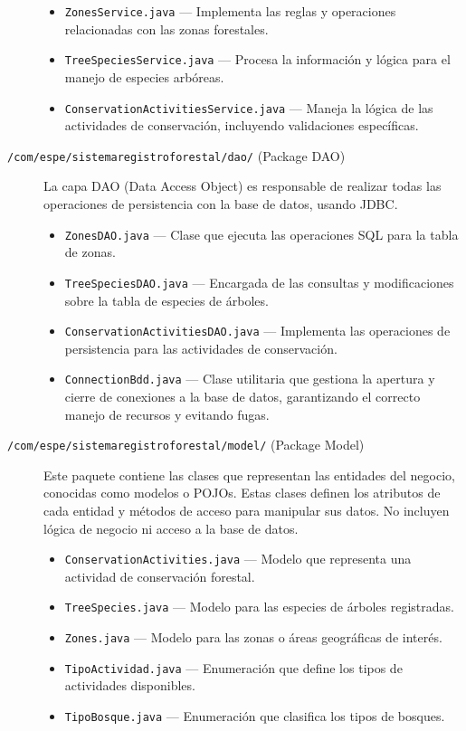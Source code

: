 \begin{description}
    \begin{itemize}
        \item \texttt{ZonesService.java} — Implementa las reglas y operaciones relacionadas con las zonas forestales.
        \item \texttt{TreeSpeciesService.java} — Procesa la información y lógica para el manejo de especies arbóreas.
        \item \texttt{ConservationActivitiesService.java} — Maneja la lógica de las actividades de conservación, incluyendo validaciones específicas.
    \end{itemize}
    \item[\texttt{/com/espe/sistemaregistroforestal/dao/} (Package DAO)] La capa DAO (Data Access Object) es responsable de realizar todas las operaciones de persistencia con la base de datos, usando JDBC.
    \begin{itemize}
        \item \texttt{ZonesDAO.java} — Clase que ejecuta las operaciones SQL para la tabla de zonas.
        \item \texttt{TreeSpeciesDAO.java} — Encargada de las consultas y modificaciones sobre la tabla de especies de árboles.
        \item \texttt{ConservationActivitiesDAO.java} — Implementa las operaciones de persistencia para las actividades de conservación.
        \item \texttt{ConnectionBdd.java} — Clase utilitaria que gestiona la apertura y cierre de conexiones a la base de datos, garantizando el correcto manejo de recursos y evitando fugas.
    \end{itemize}
    \item[\texttt{/com/espe/sistemaregistroforestal/model/} (Package Model)] Este paquete contiene las clases que representan las entidades del negocio, conocidas como modelos o POJOs. Estas clases definen los atributos de cada entidad y métodos de acceso para manipular sus datos. No incluyen lógica de negocio ni acceso a la base de datos.
    \begin{itemize}
        \item \texttt{ConservationActivities.java} — Modelo que representa una actividad de conservación forestal.
        \item \texttt{TreeSpecies.java} — Modelo para las especies de árboles registradas.
        \item \texttt{Zones.java} — Modelo para las zonas o áreas geográficas de interés.
        \item \texttt{TipoActividad.java} — Enumeración que define los tipos de actividades disponibles.
        \item \texttt{TipoBosque.java} — Enumeración que clasifica los tipos de bosques.
    \end{itemize}
\end{description}

